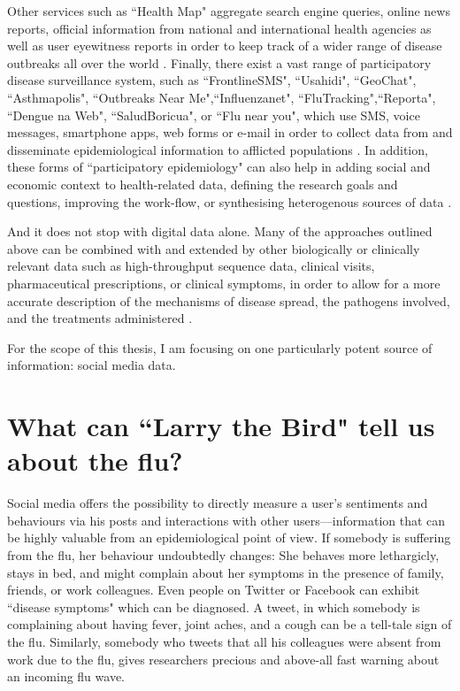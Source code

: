 \documentclass[11pt, a4paper,twoside]{report}\usepackage[]{graphicx}\usepackage[]{color}
\begin{document}
Other services such as ``Health Map" aggregate search engine queries, online news reports, official information from national and international health agencies as well as user eyewitness reports in order to keep track of a wider range of disease outbreaks all over the world \citep{brownstein_surveillance_2008,freifeld_healthmap:_2008}. Finally, there exist a vast range of participatory disease surveillance system, such as ``FrontlineSMS", ``Usahidi", ``GeoChat", ``Asthmapolis", ``Outbreaks Near Me",``Influenzanet", ``FluTracking",``Reporta", ``Dengue na Web", ``SaludBoricua", or ``Flu near you", which use SMS, voice messages, smartphone apps, web forms or e-mail in order to collect data from and disseminate epidemiological information to afflicted populations \citep{freifeld_participatory_2010,chunara_flu_2013,wojcik_public_2014,chunara_estimating_2015}. In addition, these forms of ``participatory epidemiology" can also help in adding social and economic context to health-related data, defining the research goals and questions, improving the work-flow, or synthesising heterogenous sources of data \citep{bach_participatory_2017,liu_assessing_2017}.

And it does not stop with digital data alone. Many of the approaches outlined above can be combined with and extended by other biologically or clinically relevant data such as high-throughput sequence data, clinical visits, pharmaceutical prescriptions, or clinical symptoms, in order to allow for a more accurate description of the mechanisms of disease spread, the pathogens involved, and the treatments administered \citep{ray_network_2016}.

For the scope of this thesis, I am focusing on one particularly potent source of information: social media data.

\section{What can ``Larry the Bird" tell us about the flu?}
Social media offers the possibility to directly measure a user's sentiments and behaviours via his posts and interactions with other users---information that can be highly valuable from an epidemiological point of view. If somebody is suffering from the flu, her behaviour undoubtedly changes: She behaves more lethargicly, stays in bed, and might complain about her symptoms in the presence of family, friends, or work colleagues. Even people on Twitter or Facebook can exhibit ``disease symptoms" which can be diagnosed. A tweet, in which somebody is complaining about having fever, joint aches, and a cough can be a tell-tale sign of the flu. Similarly, somebody who tweets that all his colleagues were absent from work due to the flu, gives researchers precious and above-all fast warning about an incoming flu wave.
\end{document}
